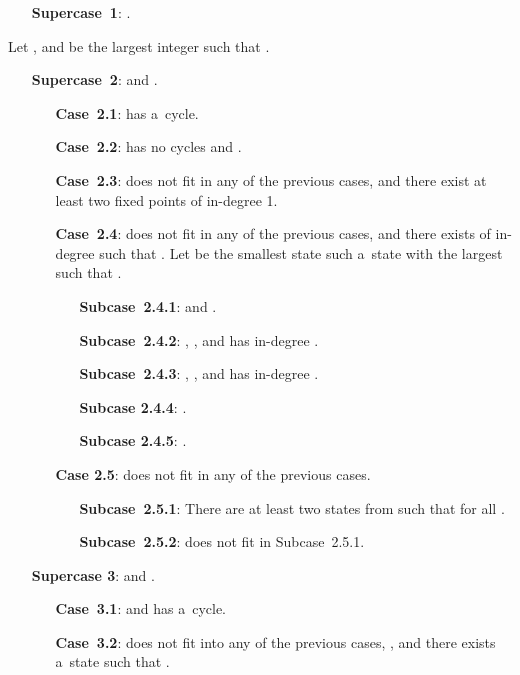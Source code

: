 \documentclass{amsart}
\begin{document}
{
\begin{enumerate}[leftmargin=*,widest=\textbf{Supercase~1}]
\item[\textbf{Supercase~1}:]
.
\end{enumerate}

Let , and  be the largest integer such that .
\begin{enumerate}[leftmargin=*,widest=\textbf{Supercase~1}]
\item[\textbf{Supercase~2}:]
 and .
\begin{enumerate}[leftmargin=*,widest=\textbf{Case~2.1}]
\item[\textbf{Case~2.1}:]  has a~cycle.
\item[\textbf{Case~2.2}:]  has no cycles and .
\item[\textbf{Case~2.3}:]  does not fit in any of the previous cases, and there exist at least two fixed points of in-degree 1.
\item[\textbf{Case~2.4}:]  does not fit in any of the previous cases, and there exists  of in-degree  such that .
Let  be the smallest state such a~state with the largest  such that .
\begin{enumerate}[leftmargin=*,widest=\textbf{Subcase~2.4.1}]
\item[\textbf{Subcase~2.4.1}:]  and .
\item[\textbf{Subcase~2.4.2}:] , , and  has in-degree .
\item[\textbf{Subcase~2.4.3}:] , , and  has in-degree .
\item[\textbf{Subcase 2.4.4}:] .
\item[\textbf{Subcase 2.4.5}:] .
\end{enumerate}
\item[\textbf{Case 2.5}:]  does not fit in any of the previous cases.
\begin{enumerate}[leftmargin=*,widest=\textbf{Subcase~2.5.1}]
\item[\textbf{Subcase~2.5.1}:] There are at least two states  from  such that  for all .
\item[\textbf{Subcase~2.5.2}:]  does not fit in Subcase~2.5.1.
\end{enumerate}
\end{enumerate}
\medskip
\item[\textbf{Supercase 3}:]  and .
\begin{enumerate}[leftmargin=*,widest=\textbf{Case~3.1}]
\item[\textbf{Case~3.1}:]  and  has a~cycle.
\item[\textbf{Case~3.2}:]  does not fit into any of the previous cases, , and there exists a~state  such that .

\end{enumerate}
\end{enumerate}}
\end{document}
